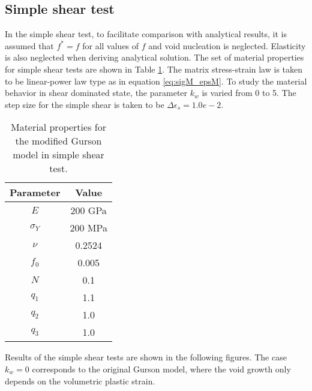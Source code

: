 \subsection{Simple shear test}
In the simple shear test, to facilitate comparison with analytical
results, it is assumed that $f^* = f$ for all values of $f$ and void
nucleation is neglected. Elasticity is also neglected when deriving
analytical solution. The set of material properties for simple shear
tests are shown in Table \ref{tab:matl_shear}. The matrix
stress-strain law is taken to be linear-power law type as in equation
\eqref{eq:sigM_epsM}. To study the material behavior in shear
dominated state, the parameter $k_w$ is varied from 0 to 5. The step
size for the simple shear is taken to be $\Delta\epsilon_s = 1.0e-2$.

\begin{table}[H]
  \begin{center}
    \begin{tabular}{ c c}
      \toprule
      Parameter	  &	  Value	  \\
	  \midrule
	  $E$ 			  & 200 GPa 	 \\
	  $\sigma_Y$ & 200 MPa \\
	  $\nu$			  & 0.2524  \\
	  $f_0$     	  & 0.005 \\
	  $N$             & 0.1 \\
	  $q_1$          & 1.1 \\
	  $q_2$          & 1.0 \\
	  $q_3$          & 1.0 \\     
      \bottomrule
    \end{tabular}
    \caption{Material properties for the modified Gurson model in
      simple shear test.}
    \label{tab:matl_shear}
  \end{center}
\end{table}

Results of the simple shear tests are shown in the following
figures. The case $k_w = 0$ corresponds to the original Gurson model,
where the void growth only depends on the volumetric plastic strain.


